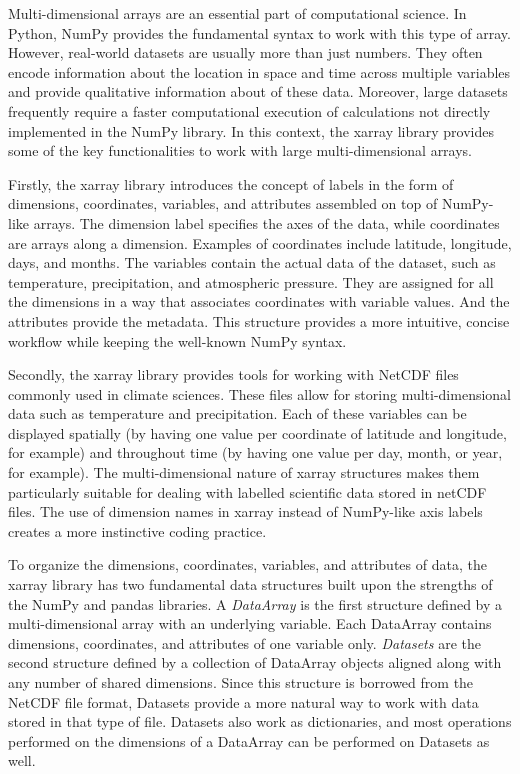 \documentclass[
]{book}
\begin{document}
Multi-dimensional arrays are an essential part of computational science. In Python, NumPy provides the fundamental syntax to work with this type of array. However, real-world datasets are usually more than just numbers. They often encode information about the location in space and time across multiple variables and provide qualitative information about of these data. Moreover, large datasets frequently require a faster computational execution of calculations not directly implemented in the NumPy library. In this context, the xarray library provides some of the key functionalities to work with large multi-dimensional arrays.

Firstly, the xarray library introduces the concept of labels in the form of dimensions, coordinates, variables, and attributes assembled on top of NumPy-like arrays. The dimension label specifies the axes of the data, while coordinates are arrays along a dimension. Examples of coordinates include latitude, longitude, days, and months. The variables contain the actual data of the dataset, such as temperature, precipitation, and atmospheric pressure. They are assigned for all the dimensions in a way that associates coordinates with variable values. And the attributes provide the metadata. This structure provides a more intuitive, concise workflow while keeping the well-known NumPy syntax.

Secondly, the xarray library provides tools for working with NetCDF files commonly used in climate sciences. These files allow for storing multi-dimensional data such as temperature and precipitation. Each of these variables can be displayed spatially (by having one value per coordinate of latitude and longitude, for example) and throughout time (by having one value per day, month, or year, for example). The multi-dimensional nature of xarray structures makes them particularly suitable for dealing with labelled scientific data stored in netCDF files. The use of dimension names in xarray instead of NumPy-like axis labels creates a more instinctive coding practice.

To organize the dimensions, coordinates, variables, and attributes of data, the xarray library has two fundamental data structures built upon the strengths of the NumPy and pandas libraries. A \emph{DataArray} is the first structure defined by a multi-dimensional array with an underlying variable. Each DataArray contains dimensions, coordinates, and attributes of one variable only. \emph{Datasets} are the second structure defined by a collection of DataArray objects aligned along with any number of shared dimensions. Since this structure is borrowed from the NetCDF file format, Datasets provide a more natural way to work with data stored in that type of file. Datasets also work as dictionaries, and most operations performed on the dimensions of a DataArray can be performed on Datasets as well.
\end{document}
